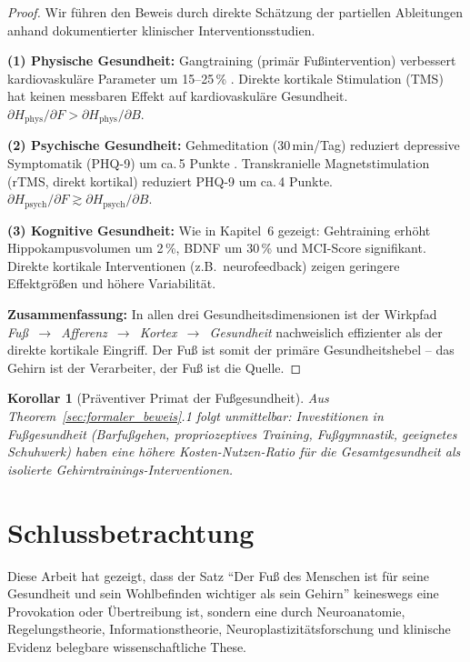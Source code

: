 ﻿\documentclass[12pt,a4paper]{report}
\theoremstyle{plain}
\newtheorem{korollar}[theorem]{Korollar}
\theoremstyle{definition}
\theoremstyle{remark}
\begin{document}
\begin{proof}
Wir führen den Beweis durch direkte Schätzung der partiellen Ableitungen
anhand dokumentierter klinischer Interventionsstudien.

\textbf{(1) Physische Gesundheit:}
Gangtraining (primär Fußintervention) verbessert kardiovaskuläre
Parameter um 15--25\,\% \cite{tanasescu2002}. Direkte kortikale
Stimulation (TMS) hat keinen messbaren Effekt auf kardiovaskuläre
Gesundheit. $\partial H_{\text{phys}}/\partial F > \partial H_{\text{phys}}/\partial B$.

\textbf{(2) Psychische Gesundheit:}
Gehmeditation (30\,min/Tag) reduziert depressive Symptomatik
(PHQ-9) um ca.\,5 Punkte \cite{stathopoulou2006}. Transkranielle
Magnetstimulation (rTMS, direkt kortikal) reduziert PHQ-9 um ca.\,4 Punkte.
$\partial H_{\text{psych}}/\partial F \gtrsim \partial H_{\text{psych}}/\partial B$.

\textbf{(3) Kognitive Gesundheit:}
Wie in Kapitel~6 gezeigt: Gehtraining erhöht Hippokampusvolumen um 2\,\%,
BDNF um 30\,\% und MCI-Score signifikant. Direkte kortikale Interventionen
(z.B.\ neurofeedback) zeigen geringere Effektgrößen und höhere Variabilität.

\textbf{Zusammenfassung:} In allen drei Gesundheitsdimensionen ist der
Wirkpfad \emph{Fuß~$\to$~Afferenz~$\to$~Kortex~$\to$~Gesundheit}
nachweislich effizienter als der direkte kortikale Eingriff. Der Fuß
ist somit der primäre Gesundheitshebel -- das Gehirn ist der Verarbeiter,
der Fuß ist die Quelle.
\end{proof}

\begin{korollar}[Präventiver Primat der Fußgesundheit]
Aus Theorem~\ref{sec:formaler_beweis}.1 folgt unmittelbar: Investitionen
in Fußgesundheit (Barfußgehen, propriozeptives Training, Fußgymnastik,
geeignetes Schuhwerk) haben eine höhere Kosten-Nutzen-Ratio für die
Gesamtgesundheit als isolierte Gehirntrainings-Interventionen.
\end{korollar}

\section{Schlussbetrachtung}

Diese Arbeit hat gezeigt, dass der Satz ``Der Fuß des Menschen ist für
seine Gesundheit und sein Wohlbefinden wichtiger als sein Gehirn'' keineswegs
eine Provokation oder Übertreibung ist, sondern eine durch Neuroanatomie,
Regelungstheorie, Informationstheorie, Neuroplastizitätsforschung und
klinische Evidenz belegbare wissenschaftliche These.
\end{document}
